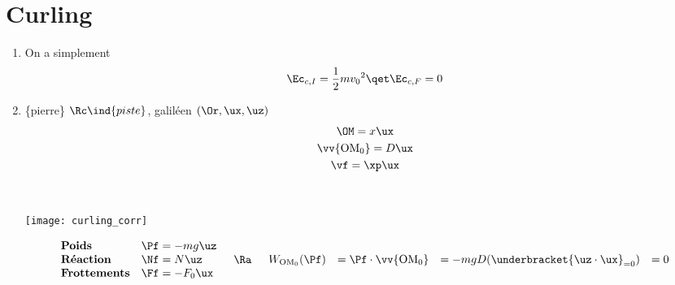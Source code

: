 \documentclass[a4paper, 12pt, final, garamond]{book}
\begin{document}
\section{Curling}
\begin{enumerate}
    \item On a simplement
        \[
            \Ec_{c,I} = \frac{1}{2}mv_0{}^2
            \qet
            \Ec_{c,F} = 0
        \]
    \item 
        \begin{minipage}[t]{0.40\linewidth}
            \begin{itemize}[label=$\diamond$, leftmargin=10pt]
                 \{pierre\}
                 $\Rc\ind{piste}$, galiléen
                 $(\Or,\ux,\uz)$
                    \begin{gather*}
                        \OM = x\ux\\
                        \vv{\rm OM_0} = D\ux\\
                        \vf = \xp\ux
                    \end{gather*}
            \end{itemize}
        \end{minipage}
        \hfill
        \begin{minipage}[t]{0.65\linewidth}
            ~
            \begin{center}
                \texttt{[image: curling\_corr]}
                \label{fig:curling}
            \end{center}
        \end{minipage} \bigbreak
        \begin{itemize}[label=$\diamond$, leftmargin=10pt]
                \[
                    \begin{array}{ll}
                        \textbf{Poids} & \Pf = -mg\uz\\
                        \textbf{Réaction} & \Nf = N\uz\\
                        \textbf{Frottements} & \Ff = -F_0\ux
                    \end{array}
                    \quad\Ra\quad
                    \begin{array}{llll}
                        W_{\rm OM_0}(\Pf) &= \Pf\cdot\vv{\rm OM_0} &=
                        -mgD(\underbracket{\uz\cdot\ux}_{=0}) &= 0\\

\end{array}\]
\end{itemize}
\end{enumerate}
\end{document}
